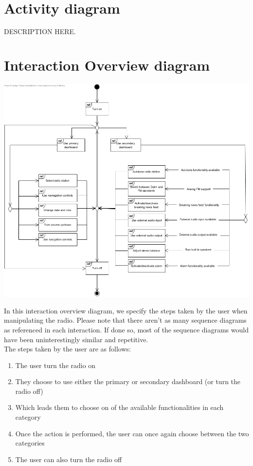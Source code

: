 \documentclass[11pt]{article}
\begin{document}
\pagebreak
\section{Activity diagram}
\vspace{10px}
\begin{center}
\end{center}
DESCRIPTION HERE.

\pagebreak
\section{Interaction Overview diagram}
\vspace{10px}
\begin{center}
\includegraphics[width=15cm]{../Diagrams/InteractionOverview-v2.jpg}\\
\end{center}
In this interaction overview diagram, we specify the steps taken by the user when manipulating the radio. Please note that there aren't as many sequence diagrams as referenced in each interaction. If done so, most of the sequence diagrams would have been uninterestingly similar and repetitive.\\
The steps taken by the user are as follows:
\begin{enumerate}
\item The user turn the radio on
\item They choose to use either the primary or secondary dashboard (or turn the radio off)
\item Which leads them to choose on of the available functionalities in each category
\item Once the action is performed, the user can once again choose between the two categories
\item The user can also turn the radio off
\end{enumerate}
\end{document}

